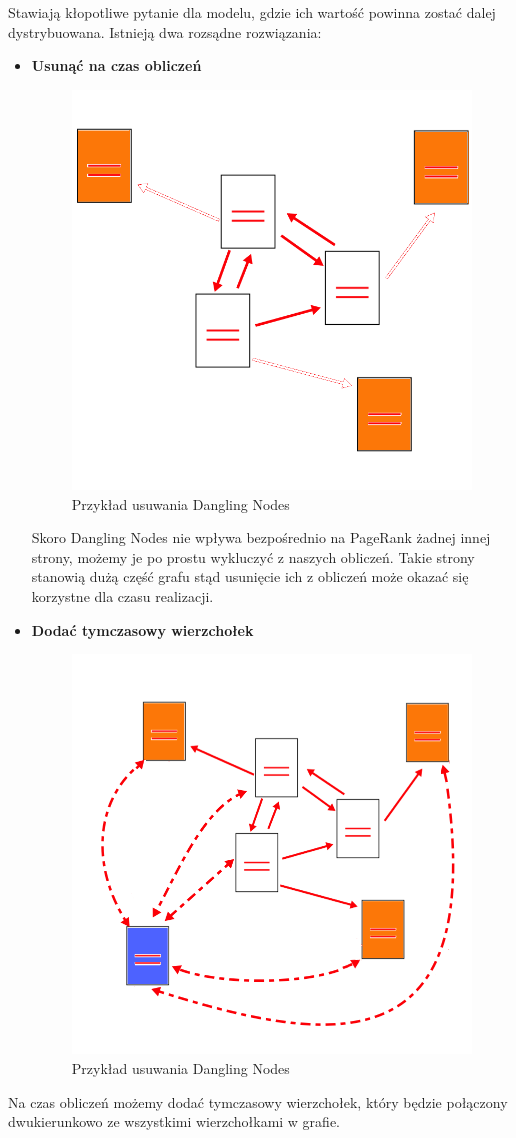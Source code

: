 \documentclass[licencjacka]{pracadypl}
\theoremstyle{definition}
\newcommand{\linia}{\rule{\linewidth}{0.4mm}}
\begin{document}
Stawiają kłopotliwe pytanie dla modelu, gdzie ich wartość powinna zostać dalej dystrybuowana.
Istnieją dwa rozsądne rozwiązania:
\begin{itemize}
	\item \textbf{Usunąć na czas obliczeń}
	\begin{figure}[H]
		\centering
		\includegraphics[width=0.4\linewidth]{img/pagerank-without-dangling-node}
		\caption{Przykład usuwania Dangling Nodes}
	\end{figure}
Skoro Dangling Nodes nie wpływa bezpośrednio na PageRank żadnej innej strony, możemy je po prostu wykluczyć z naszych obliczeń. 
Takie strony stanowią dużą część grafu stąd usunięcie ich z obliczeń może okazać się korzystne dla czasu realizacji.
	
	\item \textbf{Dodać tymczasowy wierzchołek}
		\begin{figure}[H]
		\centering
		\includegraphics[width=0.4\linewidth]{img/pagerank-withextra-dangling-node}
		\caption{Przykład usuwania Dangling Nodes}
	\end{figure}
\end{itemize}
Na czas obliczeń możemy dodać tymczasowy wierzchołek, który będzie połączony dwukierunkowo ze wszystkimi wierzchołkami w grafie.

%
\end{document}
